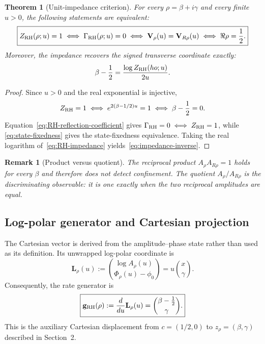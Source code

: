 \documentclass[11pt]{article}
\newtheorem{theorem}[definition]{Theorem}
\newtheorem{remark}[definition]{Remark}
\begin{document}
\begin{theorem}[Unit-impedance criterion]\label{thm:unit-impedance}
For every $\rho=\beta+i\gamma$ and every finite $u>0$, the following statements are
equivalent:
\begin{equation}\label{eq:unit-impedance-equivalence}
 \boxed{
 Z_{\rm RH}(\rho;u)=1
 \iff \Gamma_{\rm RH}(\rho;u)=0
 \iff \mathbf V_\rho(u)=\mathbf V_{R\rho}(u)
 \iff \Re\rho=\frac12.}
\end{equation}
Moreover, the impedance recovers the signed transverse coordinate exactly:
\begin{equation}\label{eq:impedance-inverse}
 \beta-\frac12=\frac{\log Z_{\rm RH}(
ho;u)}{2u}.
\end{equation}
\end{theorem}

\begin{proof}
Since $u>0$ and the real exponential is injective,
\begin{equation}
 Z_{\rm RH}=1
 \iff e^{2(\beta-1/2)u}=1
 \iff \beta-\frac12=0.
\end{equation}
Equation~\eqref{eq:RH-reflection-coefficient} gives
$\Gamma_{\rm RH}=0\iff Z_{\rm RH}=1$, while
\eqref{eq:state-fixedness} gives the state-fixedness equivalence.  Taking the real logarithm
of~\eqref{eq:RH-impedance} yields~\eqref{eq:impedance-inverse}.
\end{proof}

\begin{remark}[Product versus quotient]\label{rem:product-quotient}
The reciprocal product $A_\rho A_{R\rho}=1$ holds for every $\beta$ and therefore does not
detect confinement.  The quotient $A_\rho/A_{R\rho}$ is the discriminating observable: it is
one exactly when the two reciprocal amplitudes are equal.
\end{remark}

\subsection{Log-polar generator and Cartesian projection}
The Cartesian vector is derived from the amplitude--phase state rather than used as its
definition.  Its unwrapped log-polar coordinate is
\begin{equation}\label{eq:log-polar-linearization}
 \mathbf L_\rho(u):=\binom{\log A_\rho(u)}{\Phi_\rho(u)-\phi_0}
 =u\binom{x}{\gamma}.
\end{equation}
Consequently, the rate generator is
\begin{equation}\label{eq:generator}
 \boxed{\mathbf g_{\rm RH}(\rho)
 :=\frac{d}{du}\mathbf L_\rho(u)
 =\binom{\beta-\tfrac12}{\gamma}.}
\end{equation}
This is the auxiliary Cartesian displacement from $c=(1/2,0)$ to
$z_\rho=(\beta,\gamma)$ described in Section~2.
\end{document}
